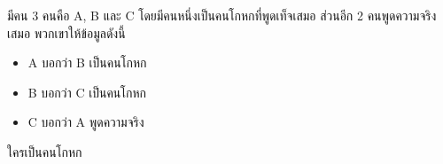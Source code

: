 ﻿%
\question มีคน 3 คนคือ A, B และ C โดยมีคนหนึ่งเป็นคนโกหกที่พูดเท็จเสมอ ส่วนอีก 2 คนพูดความจริงเสมอ พวกเขาให้ข้อมูลดังนี้
\begin{itemize}
\item A บอกว่า B เป็นคนโกหก
\item B บอกว่า C เป็นคนโกหก
\item C บอกว่า A พูดความจริง
\end{itemize}
ใครเป็นคนโกหก
\newline
{}
